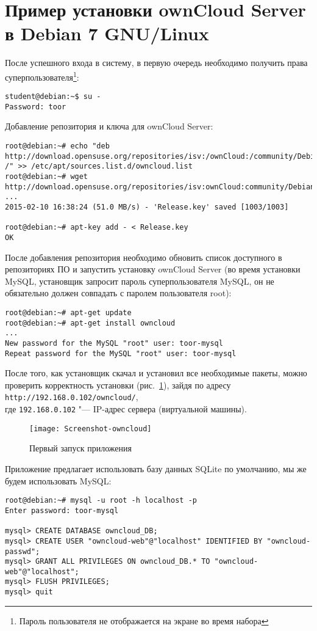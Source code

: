 \section{Пример установки ownCloud Server в Debian 7 GNU/Linux} \label{pril:c}

После успешного входа в систему, в первую очередь необходимо получить права суперпользователя\footnote{Пароль пользователя не отображается на экране во время набора}:
\begin{lstlisting}
student@debian:~$ su -
Password: toor
\end{lstlisting}

Добавление репозитория и ключа для ownCloud Server:
\begin{lstlisting}
root@debian:~# echo "deb http://download.opensuse.org/repositories/isv:/ownCloud:/community/Debian_7.0/ /" >> /etc/apt/sources.list.d/owncloud.list
root@debian:~# wget http://download.opensuse.org/repositories/isv:ownCloud:community/Debian_7.0/Release.key
...
2015-02-10 16:38:24 (51.0 MB/s) - 'Release.key' saved [1003/1003]

root@debian:~# apt-key add - < Release.key
OK
\end{lstlisting}

После добавления репозитория необходимо обновить список доступного в репозиториях ПО и запустить установку ownCloud Server (во время установки MySQL, установщик запросит пароль суперпользователя MySQL, он не обязательно должен совпадать с паролем пользователя root):
\begin{lstlisting}
root@debian:~# apt-get update
root@debian:~# apt-get install owncloud
...
New password for the MySQL "root" user: toor-mysql
Repeat password for the MySQL "root" user: toor-mysql
\end{lstlisting}

После того, как установщик скачал и установил все необходимые пакеты, можно проверить корректность установки (рис.~\ref{pic:first-own}), зайдя по адресу \texttt{http://192.168.0.102/owncloud/}, \\
где \texttt{192.168.0.102} "--- IP-адрес сервера (виртуальной машины).

\begin{figure}[ht]
    \centering
	\texttt{[image: Screenshot-owncloud]}
	\caption{Первый запуск приложения}\label{pic:first-own}
\end{figure}

Приложение предлагает использовать базу данных SQLite по умолчанию, мы же будем использовать MySQL:
\begin{lstlisting}
root@debian:~# mysql -u root -h localhost -p
Enter password: toor-mysql

mysql> CREATE DATABASE owncloud_DB;
mysql> CREATE USER "owncloud-web"@"localhost" IDENTIFIED BY "owncloud-passwd";
mysql> GRANT ALL PRIVILEGES ON owncloud_DB.* TO "owncloud-web"@"localhost";
mysql> FLUSH PRIVILEGES;
mysql> quit
\end{lstlisting}

